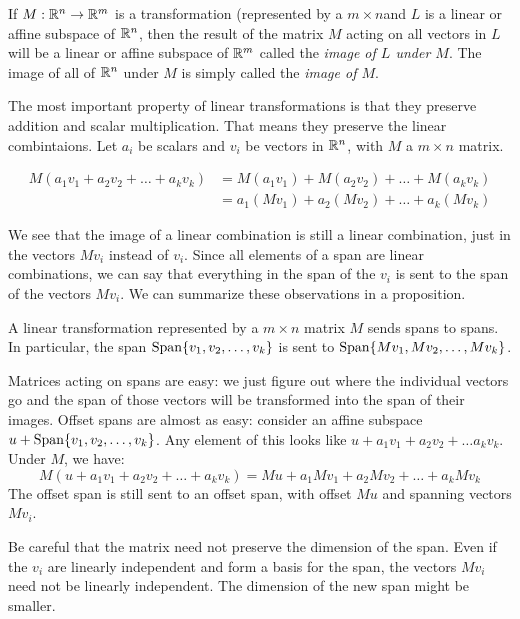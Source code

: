 \documentclass[fleqn]{report}
\begin{document}
\begin{defn}
If $M: \mathbb{R}^n \rightarrow \mathbb{R}^m$ is a transformation
(represented by a $m \times n$and $L$ is
a linear or affine subspace of $\mathbb{R}^n$, then the result of the
matrix $M$ acting on all vectors in $L$ will be a linear or
affine subspace of $\mathbb{R}^m$ called the \emph{image of $L$ under
$M$}. The image of all of $\mathbb{R}^n$ under $M$ is simply called
the \emph{image of $M$}.
\end{defn}

The most important property of linear transformations is that
they preserve addition and scalar multiplication. That means
they preserve the linear combintaions. Let $a_i$ be
scalars and $v_i$ be vectors in $\mathbb{R}^n$, with $M$ a $m\times
n$ matrix.

\begin{align*}
M(a_1 v_1 + a_2v_2 + \ldots + a_kv_k) & = M(a_1v_1) + M(a_2v_2)
+ \ldots + M(a_kv_k) \\
& = a_1(Mv_1) + a_2(Mv_2) + \ldots + a_k
(Mv_k)
\end{align*}

We see that the image of a linear combination is still a
linear combination, just in the vectors $Mv_i$ instead of
$v_i$. Since all elements of a span are linear combinations,
we can say that everything in the span of the $v_i$ is sent to
the span of the vectors $Mv_i$. We can summarize these
observations in a proposition.

\begin{prop}
A linear transformation represented by a $m \times n$ matrix
$M$ sends spans to spans. In particular, the span $\mathrm{Span} \{
v_1, v_2, \ldots, v_k\}$ is sent to $\mathrm{Span} \{ Mv_1, Mv_2,
\ldots, Mv_k\}$.
\end{prop}

Matrices acting on spans are easy: we just figure out where
the individual vectors go and the span of those vectors will be
transformed into the span of their images. Offset spans are
almost as easy: consider an affine subspace $u + \mathrm{Span} \{
v_1, v_2, \ldots, v_k\}$. Any element of this looks like $u +
a_1v_1 + a_2v_2 + \ldots a_kv_k$. Under $M$, we have:
\begin{equation*}
M(u + a_1v_1 + a_2v_2 + \ldots + a_kv_k) = Mu + a_1 Mv_1 +
a_2Mv_2 + \ldots + a_kMv_k
\end{equation*}
The offset span is still sent to an offset span, with offset
$Mu$ and spanning vectors $Mv_i$. 

Be careful that the matrix need not preserve the dimension of the
span. Even if the $v_i$ are linearly independent and form a
basis for the span, the vectors $Mv_i$ need not be linearly
independent. The dimension of the new span might be smaller.
\end{document}
